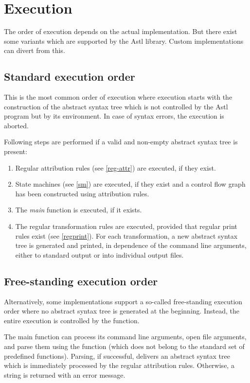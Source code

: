 \chapter{Execution}
The order of execution depends on the actual implementation. But
there exist some variants which are supported by the Astl library.
Custom implementations can divert from this.

\section{Standard execution order}\label{xorder}
This is the most common order of execution where
execution starts with the construction of the abstract syntax tree
which is not controlled by the Astl program but by its environment.
In case of syntax errors, the execution is aborted.

Following steps are performed if a valid and non-empty
abstract syntax tree is present:

\begin{enumerate}
   \item Regular attribution rules (see \ref{reg-attr}) are executed,
      if they exist.
   \item State machines (see \ref{sm}) are executed, if they exist
      and a control flow graph has been constructed using attribution rules.
   \item The \textit{main} function is executed, if it exists.
   \item The regular transformation rules are executed, provided
      that regular print rules exist (see \ref{regprint}).
      For each transformation, a new abstract syntax tree is generated
      and printed, in dependence of the command line arguments, either
      to standard output or into individual output files.
\end{enumerate}

\section{Free-standing execution order}\label{free-xorder}
Alternatively, some implementations support a so-called free-standing execution
order
where no abstract syntax tree is generated at the
beginning. Instead, the entire execution is controlled by the
 function.

The main function can process its command line arguments,
open file arguments, and parse them using the 
function (which does not belong to the standard set of predefined functions).
Parsing, if successful, delivers an abstract syntax tree which is
immediately processed by the regular attribution rules. Otherwise,
a string is returned with an error message.

